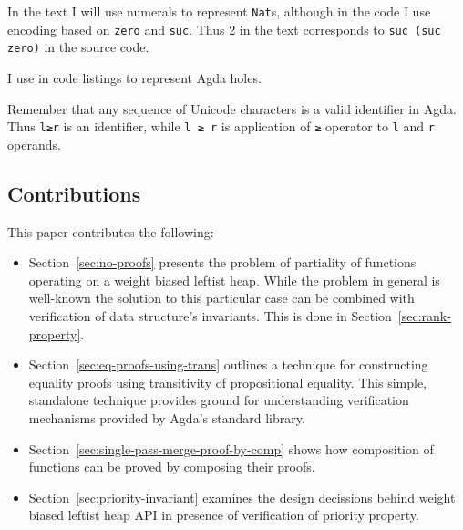 In the text I will use numerals to represent \texttt{Nat}s, although in the code I use encoding based on \texttt{zero} and \texttt{suc}. Thus 2 in the text corresponds to \texttt{suc (suc zero)} in the source code.

I use \texttt{} in code listings to represent Agda holes.

Remember that any sequence of Unicode characters is a valid identifier in Agda. Thus \texttt{l≥r} is an identifier, while \texttt{l ≥ r} is application of \texttt{≥} operator to \texttt{l} and \texttt{r} operands.

\subsection{Contributions}

This paper contributes the following:

\begin{itemize}
 \item Section~\ref{sec:no-proofs} presents the problem of partiality of functions operating on a weight biased leftist heap. While the problem in general is well-known the solution to this particular case can be combined with verification of data structure's invariants. This is done in Section~\ref{sec:rank-property}.
 \item Section~\ref{sec:eq-proofs-using-trans} outlines a technique for constructing equality proofs using transitivity of propositional equality. This simple, standalone technique provides ground for understanding verification mechanisms provided by Agda's standard library.
 \item Section~\ref{sec:single-pass-merge-proof-by-comp} shows how composition of functions can be proved by composing their proofs.
 \item Section~\ref{sec:priority-invariant} examines the design decissions behind weight biased leftist heap API in presence of verification of priority property.
\end{itemize}
